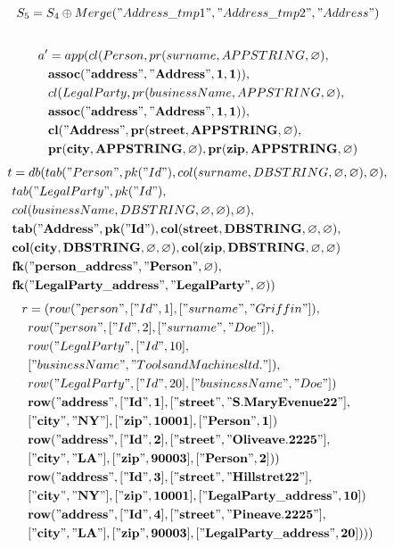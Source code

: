 \documentclass[11pt]{article}
\begin{document}
\newpage
\begin{align*}
	S_5 &= S_4 \oplus Merge("Address\_tmp1", "Address\_tmp2", "Address") \\
& 
\end{align*}
\hline
\begin{align*}
a' &=app(cl(Person, pr(surname, APPSTRING, \varnothing), \\ 
& \mathbf{assoc("address", "Address", 1, 1)}), \\ 
& cl(LegalParty, pr(businessName, APPSTRING, \varnothing),\\
& \mathbf{assoc("address", "Address", 1, 1)}), \\
& \mathbf{cl("Address", pr(street, APPSTRING, \varnothing),} \\
& \mathbf{pr(city, APPSTRING, \varnothing), pr(zip, APPSTRING, \varnothing)}
\end{align*}
\begin{align*}
t &=db(tab("Person", pk("Id"), col(surname, DBSTRING, \varnothing, \varnothing), \varnothing), \\
& tab("LegalParty", pk("Id"),  \\
& col(businessName, DBSTRING, \varnothing, \varnothing), \varnothing), \\
& \mathbf{tab("Address", pk("Id"), col(street, DBSTRING, \varnothing, \varnothing)},\\
& \mathbf{col(city, DBSTRING, \varnothing, \varnothing), col(zip, DBSTRING, \varnothing, \varnothing)} \\
& \mathbf{fk("person\_address", "Person", \varnothing)},\\
& \mathbf{fk("LegalParty\_address", "LegalParty", \varnothing)}) 
\end{align*}
\begin{align*}
r &= (row("person", ["Id", 1], ["surname", "Griffin"]), \\
& row("person", ["Id", 2], ["surname", "Doe"]), \\
& row("LegalParty", ["Id", 10], \\
& ["businessName", "Tools and Machines ltd."]), \\
& row("LegalParty", ["Id", 20], ["businessName", "Doe"])\\
& \mathbf{row("address", ["Id", 1], ["street", "S. Mary Evenue 22"]}, \\ 
& \mathbf{["city", "NY"], ["zip", 10001], ["Person", 1])} \\
& \mathbf{row("address", ["Id", 2], ["street", "Olive ave. 2225"],} \\
& \mathbf{["city", "LA"], ["zip", 90003], ["Person", 2])} )\\
& \mathbf{row("address", ["Id", 3], ["street", "Hill stret 22"], }\\
& \mathbf{["city", "NY"], ["zip", 10001], ["LegalParty\_address", 10]}) \\
& \mathbf{row("address", ["Id", 4], ["street", "Pine ave. 2225"],} \\
& \mathbf{["city", "LA"], ["zip", 90003], ["LegalParty\_address", 20])} ))
\end{align*}
\end{document}
